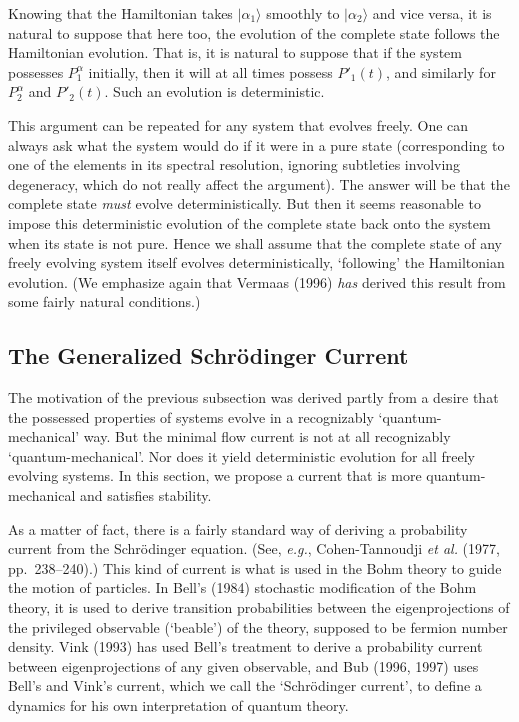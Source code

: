 \documentclass[12pt]{article}
\newcommand{\eg}{{\it e.g.}}
\newcommand{\ga}{\alpha}                                        %
\newcommand{\ket}[1]{\vert #1\rangle}                           %
\begin{document}
Knowing that the Hamiltonian takes $\ket{\ga_1}$ smoothly to 
$\ket{\ga_2}$ and vice versa, it is natural to suppose that here too, 
the evolution of the complete state follows the Hamiltonian evolution.  
That is, it is natural to suppose that if the system possesses 
$P^{\ga}_1$ initially, then it will at all times possess ${P'}_1(t)$, 
and similarly for $P^{\ga}_2$ and ${P'}_2(t)$.  Such an evolution is 
deterministic.

This argument can be repeated for any system that evolves freely.  One 
can always ask what the system would do if it were in a pure state 
(corresponding to one of the elements in its spectral resolution, 
ignoring subtleties involving degeneracy, which do not really affect 
the argument).  The answer will be that the complete state {\it must} 
evolve deterministically.  But then it seems reasonable to impose this 
deterministic evolution of the complete state back onto the system 
when its state is not pure.  Hence we shall assume that the complete 
state of any freely evolving system itself evolves deterministically, 
`following' the Hamiltonian evolution.  (We emphasize again that 
Vermaas (1996) {\it has} derived this result from some fairly natural 
conditions.)


\subsection{The Generalized Schr\"odinger Current}


The motivation of the previous subsection was derived partly from a
desire that the possessed properties of systems evolve in a
recognizably `quantum-mechanical' way.  But the minimal flow current
is not at all recognizably `quantum-mechanical'.  Nor does it yield
deterministic evolution for all freely evolving systems.  In this
section, we propose a current that is more quantum-mechanical and
satisfies stability.

As a matter of fact, there is a fairly standard way of deriving a 
probability current from the Schr\"odinger equation.  (See, \eg, 
Cohen-Tannoudji {\it et al.} (1977, pp.~238--240).) This kind of 
current is what is used in the Bohm theory to guide the motion of 
particles.  In Bell's (1984) stochastic modification of the Bohm 
theory, it is used to derive transition probabilities between the 
eigenprojections of the privileged observable (`beable') of the 
theory, supposed to be fermion number density.  Vink (1993) has used 
Bell's treatment to derive a probability current between 
eigenprojections of any given observable, and Bub (1996, 1997) uses 
Bell's and Vink's current, which we call the `Schr\"odinger current', 
to define a dynamics for his own interpretation of quantum theory.
\end{document}

